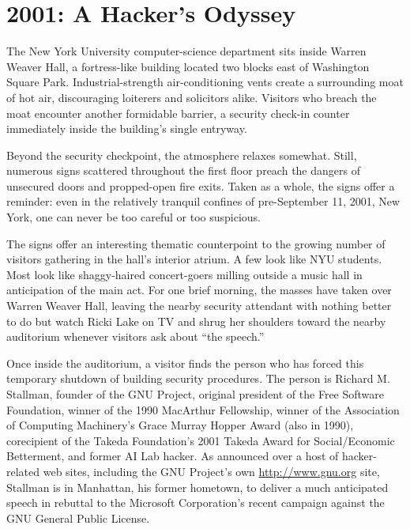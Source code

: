 
\chapter{2001: A Hacker's Odyssey}

The New York University computer-science department sits inside Warren Weaver Hall, a fortress-like building located two blocks east of Washington Square Park. Industrial-strength air-conditioning vents create a surrounding moat of hot air, discouraging loiterers and solicitors alike. Visitors who breach the moat encounter another formidable barrier, a security check-in counter immediately inside the building's single entryway.

Beyond the security checkpoint, the atmosphere relaxes somewhat. Still, numerous signs scattered throughout the first floor preach the dangers of unsecured doors and propped-open fire exits. Taken as a whole, the signs offer a reminder: even in the relatively tranquil confines of pre-September 11, 2001, New York, one can never be too careful or too suspicious.

The signs offer an interesting thematic counterpoint to the growing number of visitors gathering in the hall's interior atrium. A few look like NYU students. Most look like shaggy-haired concert-goers milling outside a music hall in anticipation of the main act. For one brief morning, the masses have taken over Warren Weaver Hall, leaving the nearby security attendant with nothing better to do but watch Ricki Lake on TV and shrug her shoulders toward the nearby auditorium whenever visitors ask about ``the speech.''

Once inside the auditorium, a visitor finds the person who has forced this temporary shutdown of building security procedures. The person is Richard M. Stallman, founder of the GNU Project, original president of the Free Software Foundation, winner of the 1990 MacArthur Fellowship, winner of the Association of Computing Machinery's Grace Murray Hopper Award (also in 1990), corecipient of the Takeda Foundation's 2001 Takeda Award for Social/Economic Betterment, and former AI Lab hacker. As announced over a host of hacker-related web sites, including the GNU Project's own \url{http://www.gnu.org} site, Stallman is in Manhattan, his former hometown, to deliver a much anticipated speech in rebuttal to the Microsoft Corporation's recent campaign against the GNU General Public License.

